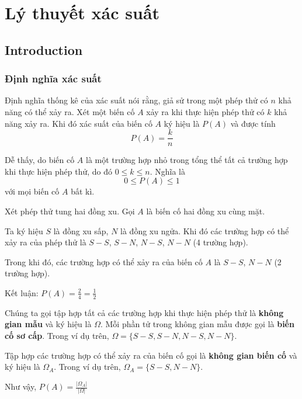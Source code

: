 \chapter{Lý thuyết xác suất}

\section{Introduction}

\subsection*{Định nghĩa xác suất}

\begin{definition}
    Định nghĩa thống kê của xác suất nói rằng, giả sử trong một phép thử có $n$ khả năng có thể xảy ra. Xét một biến cố $A$ xảy ra khi thực hiện phép thử có $k$ khả năng xảy ra. Khi đó xác suất của biến cố $A$ ký hiệu là $P(A)$ và được tính \[P(A) = \frac{k}{n}\]
\end{definition}

Dễ thấy, do biến cố $A$ là một trường hợp nhỏ trong tổng thể tất cả trường hợp khi thực hiện phép thử, do đó $0 \leq k \leq n$. Nghĩa là \[0 \leq P(A) \leq 1\] với mọi biến cố $A$ bất kì.

\begin{example}
    Xét phép thử tung hai đồng xu. Gọi $A$ là biến cố hai đồng xu cùng mặt.
    
    Ta ký hiệu $S$ là đồng xu sấp, $N$ là đồng xu ngửa. Khi đó các trường hợp có thể xảy ra của phép thử là $S-S$, $S-N$, $N-S$, $N-N$ (4 trường hợp). 
    
    Trong khi đó, các trường hợp có thể xảy ra của biến cố $A$ là $S-S$, $N-N$ (2 trường hợp).
    
    Kết luận: $P(A) = \frac{2}{4} = \frac{1}{2}$
\end{example}

Chúng ta gọi tập hợp tất cả các trường hợp khi thực hiện phép thử là \textbf{không gian mẫu} và ký hiệu là $\Omega$. Mỗi phần tử trong không gian mẫu được gọi là \textbf{biến cố sơ cấp}. Trong ví dụ trên, $\Omega = \{S-S, S-N, N-S, N-N\}$.
    
Tập hợp các trường hợp có thể xảy ra của biến cố gọi là \textbf{không gian biến cố} và ký hiệu là $\Omega_A$. Trong ví dụ trên, $\Omega_A = \{S-S, N-N\}$.
    
Như vậy, $P(A) = \frac{|\Omega_A|}{|\Omega|}$

